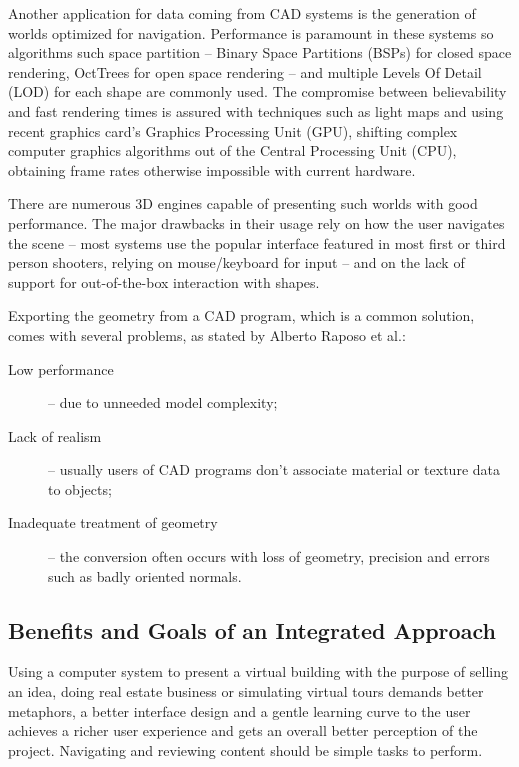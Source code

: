 Another application for data coming from CAD systems is the generation of worlds optimized for navigation.
Performance is paramount in these systems so algorithms such space partition --
Binary Space Partitions (BSPs) for closed space rendering,
OctTrees for open space rendering --
and multiple Levels Of Detail (LOD) for each shape are commonly used.
The compromise between believability and fast rendering times is assured with techniques such as
light maps and using recent graphics card's Graphics Processing Unit (GPU),
shifting complex computer graphics algorithms out of the Central Processing Unit (CPU),
obtaining frame rates otherwise impossible with current hardware.

There are numerous 3D engines capable of presenting such worlds with good performance.
The major drawbacks in their usage rely on how the user navigates the scene --
most systems use the popular interface featured in most first or third person shooters,
relying on mouse/keyboard for input --
and on the lack of support for out-of-the-box interaction with shapes.

\newpage
Exporting the geometry from a CAD program, which is a common solution, comes with several problems,
as stated by Alberto Raposo et al.\cite{CADVR06}:
\begin{description}
	\item[Low performance] -- due to unneeded model complexity;
	\item[Lack of realism] -- usually users of CAD programs don't associate material
	or texture data to objects;
	\item[Inadequate treatment of geometry] -- the conversion often occurs with loss of
	geometry, precision and errors such as badly oriented normals.
\end{description}

\subsection{Benefits and Goals of an Integrated Approach}
Using a computer system to present a virtual building with the purpose of selling an idea,
doing real estate business or simulating virtual tours demands better metaphors,
a better interface design and a gentle learning curve to the user
achieves a richer user experience and gets an overall better perception of the project.
Navigating and reviewing content should be simple tasks to perform.

